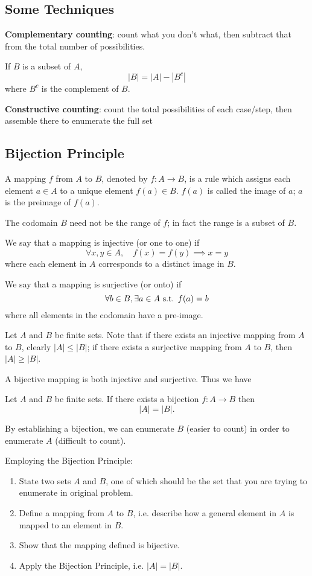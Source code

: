 \subsection{Some Techniques}
\textbf{Complementary counting}: count what you don't what, then subtract that from the total number of possibilities. 

If $B$ is a subset of $A$,
\[ |B|=|A|-|B^c| \]
where $B^c$ is the complement of $B$.

\textbf{Constructive counting}: count the total possibilities of each case/step, then assemble there to enumerate the full set

\subsection{Bijection Principle}
A mapping $f$ from $A$ to $B$, denoted by $f:A\to B$, is a rule which assigns each element $a\in A$ to a unique element $f(a)\in B$. $f(a)$ is called the image of $a$; $a$ is the preimage of $f(a)$.

\begin{remark}
The codomain $B$ need not be the range of $f$; in fact the range is a subset of $B$.
\end{remark}

We say that a mapping is injective (or one to one) if
\[ \forall x,y\in A, \quad f(x)=f(y)\implies x=y \]
where each element in $A$ corresponds to a distinct image in $B$.

We say that a mapping is surjective (or onto) if
\[ \forall b\in B, \exists a\in A\text{ s.t. } f(a)=b \]
where all elements in the codomain have a pre-image.

Let $A$ and $B$ be finite sets. Note that if there exists an injective mapping from $A$ to $B$, clearly $|A|\le|B|$; if there exists a surjective mapping from $A$ to $B$, then $|A|\ge|B|$.

A bijective mapping is both injective and surjective. Thus we have

\begin{theorem}
Let $A$ and $B$ be finite sets. If there exists a bijection $f:A\to B$ then
\[ |A|=|B|. \]
\end{theorem}

By establishing a bijection, we can enumerate $B$ (easier to count) in order to enumerate $A$ (difficult to count).

Employing the Bijection Principle:
\begin{enumerate}
\item State two sets $A$ and $B$, one of which should be the set that you are trying to enumerate in original problem.
\item Define a mapping from $A$ to $B$, i.e. describe how a general element in $A$ is mapped to an element in $B$.
\item Show that the mapping defined is bijective.
\item Apply the Bijection Principle, i.e. $|A|=|B|$.
\end{enumerate}

